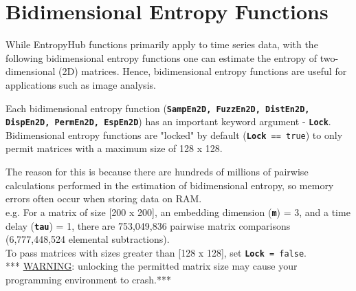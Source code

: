 \documentclass[12pt, a4paper, titlepage, openany]{book}
\begin{document}
\newpage
\section{Bidimensional Entropy Functions}
\vspace{3em}
\normalsize
While EntropyHub functions primarily apply to time series data, with the following bidimensional entropy functions one can estimate the entropy of two-dimensional (2D) matrices. Hence, bidimensional entropy functions are useful for applications such as image analysis. \\

\begin{tcolorbox}[sharp corners, colback=ehone!30, colframe=ehone, title=\hypertarget{bidinote}{\textbf{IMPORTANT NOTE}}, label={BiBox}]
Each bidimensional entropy function (\texttt{\textbf{SampEn2D, FuzzEn2D, DistEn2D, DispEn2D, PermEn2D, EspEn2D}}) has an important keyword argument - \texttt{\textbf{Lock}}. Bidimensional entropy functions are "locked" by default (\texttt{\textbf{Lock} == true}) to only permit matrices with a maximum size of 128 x 128.\\ \newline

The reason for this is because there are hundreds of millions of pairwise calculations performed in the estimation of bidimensional entropy, so memory errors often occur when storing data on RAM.\\
e.g. For a matrix of size [200 x 200], an embedding dimension (\texttt{\textbf{m}}) = 3, and a time delay (\texttt{\textbf{tau}}) = 1, there are 753,049,836 pairwise matrix comparisons (6,777,448,524 elemental subtractions).\\ \newline
To pass matrices with sizes greater than [128 x 128], set \texttt{\textbf{Lock} = false}.\\ \newline
*** \ul{WARNING}: unlocking the permitted matrix size may cause your programming environment to crash.***\\
\end{tcolorbox}




\newpage
\end{document}
